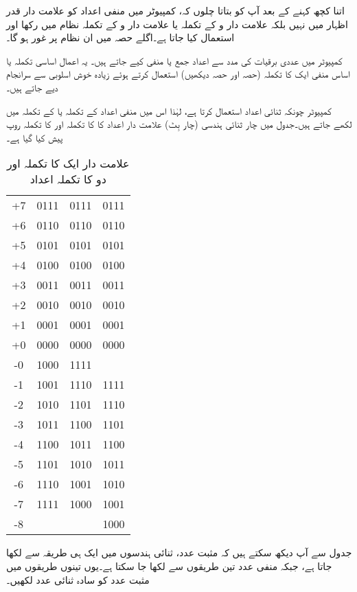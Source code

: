 اتنا کچھ کہنے کے بعد آپ کو بتاتا چلوں کہ، کمپیوٹر میں منفی اعداد کو علامت دار قدر اظہار میں نہیں بلکہ علامت دار و  کے تکملہ یا علامت دار و  کے تکملہ نظام میں رکھا اور استعمال کیا جاتا ہے۔اگلے حصہ میں ان نظام پر غور ہو گا۔

کمپیوٹر میں عددی برقیات کی مدد سے اعداد جمع یا منفی کیے جاتے ہیں۔ یہ اعمال اساسی تکملہ یا اساس منفی ایک کا تکملہ (حصہ  اور حصہ  دیکھیں) استعمال کرتے ہوئے زیادہ خوش اسلوبی سے سرانجام دیے جاتے ہیں۔

 کمپیوٹر چونکہ ثنائی اعداد استعمال کرتا ہے، لہٰذا اس میں منفی اعداد  کے تکملہ یا  کے تکملہ میں لکھے جاتے ہیں۔جدول  میں چار ثنائی ہندسی (چار بِٹ) علامت دار اعداد کا  کا تکملہ اور  کا تکملہ روپ پیش کیا گیا ہے۔
\begin{table}
\caption{علامت دار ایک کا تکملہ اور دو کا تکملہ اعداد}
\label{جدول_حساب_علامت_دار_تکملہ_ایک_دو}
\centering
\begin{tabular}{CCCC}
\toprule
{} &  &  & \\
\midrule
+7&0111&0111&0111\\
+6&0110&0110&0110\\
+5&0101&0101&0101\\
+4&0100&0100&0100\\[0.5em]
+3&0011&0011&0011\\
+2&0010&0010&0010\\
+1&0001&0001&0001\\
+0&0000&0000&0000\\[0.5em]
-0&1000&1111&\\
-1&1001&1110&1111\\
-2&1010&1101&1110\\
-3&1011&1100&1101\\[0.5em]
-4&1100&1011&1100\\
-5&1101&1010&1011\\
-6&1110&1001&1010\\
-7&1111&1000&1001\\
-8&&&1000\\
\bottomrule
\end{tabular}
\end{table}

جدول  سے آپ دیکھ سکتے ہیں کہ مثبت عدد، ثنائی ہندسوں میں ایک ہی طریقہ سے لکھا جاتا ہے، جبکہ منفی عدد تین طریقوں سے لکھا جا سکتا ہے۔یوں تینوں طریقوں میں مثبت عدد کو سادہ ثنائی عدد لکھیں۔

